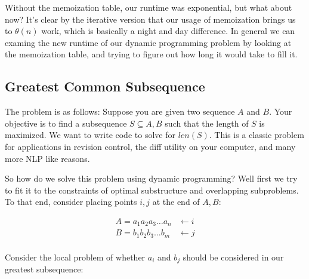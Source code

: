 Without the memoization table, our runtime was exponential, but what about now?
It's clear by the iterative version that our usage of memoization brings us to
$\theta(n)$ work, which is basically a night and day difference. In general we
can examing the new runtime of our dynamic programming problem by looking at the
memoization table, and trying to figure out how long it would take to fill it.

\subsection{Greatest Common Subsequence}

The problem is as follows: Suppose you are given two sequence $A$ and $B$. Your
objective is to find a subsequence $S \subseteq A, B$ such that the length of
$S$ is maximized. We want to write code to solve for $len(S)$. This is a
classic problem for applications in revision control, the diff utility on your
computer, and many more NLP like reasons.

So how do we solve this problem using dynamic programming? Well first we try to
fit it to the constraints of optimal substructure and overlapping subproblems.
To that end, consider placing points $i,j$ at the end of $A,B$:

\begin{align*}
A = a_1 a_2 a_3 \dots a_n & \gets i \\
B = b_1 b_2 b_3 \dots b_m & \gets j \\
\end{align*}

Consider the local problem of whether $a_i$ and $b_j$ should be considered in
our greatest subsequence:

